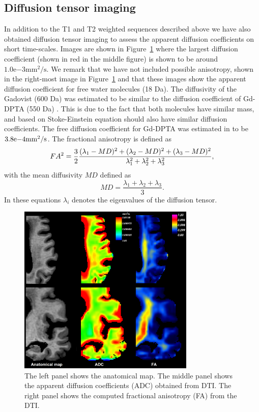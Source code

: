 \documentclass[12pt,a4paper]{article}
\begin{document}
\subsection{Diffusion tensor imaging}
In addition to the T1 and T2 weighted sequences described above we have also obtained diffusion tensor imaging to assess the apparent diffusion 
coefficients on short time-scales. Images are shown in Figure~\ref{figuredti} where the largest diffusion coefficient (shown in 
red in the middle figure) is shown to be around $1.0\mathrm{e}{-3}  \mathrm{mm^2/s}$. We remark that we have not included possible anisotropy, shown in 
the right-most image in Figure~\ref{figuredti} and that these images show the apparent diffusion coefficient for free water molecules (18 Da).      
The diffusivity of the Gadovist (600 Da) \cite{MGadobutrol} was estimated to be similar to the diffusion coefficient of Gd-DPTA (550 Da) \cite{MGgDPTA}. This is due to the fact that both molecules have similar mass, and based on Stoke-Einstein equation should also have similar diffusion coefficients. The free diffusion coefficient for Gd-DPTA was estimated in \citet{GdDPTA-DIFFUSION} to be $3.8\mathrm{e}{-4}\mathrm{mm\sp{2}/s}$.
The fractional anisotropy is defined as 
\begin{equation}
FA\sp{2} =  \frac{3}{2} \frac{ (\lambda_1 - MD )\sp{2} +(\lambda_2 - MD )\sp{2} +(\lambda_3 - MD )\sp{2}}{\lambda\sp{2}_1 + \lambda\sp{2}_2  +\lambda\sp{2}_3 },
\end{equation}
with the mean diffusivity $MD$ defined as 
\begin{equation}
MD = \frac{\lambda_1 +\lambda_2 +\lambda_3 }{3}.
\end{equation}
In these equations $\lambda_i$ denotes the eigenvalues of the diffusion tensor.
\begin{figure}
\centering
\includegraphics[width=0.75\textwidth]{DTI-zoom.png} 
\caption{The left panel shows the anatomical map. The middle panel shows the apparent diffusion coefficients (ADC) obtained from DTI. The right panel shows the computed fractional anisotropy (FA) from the DTI.}
\label{figuredti} 
\end{figure}
\end{document}
